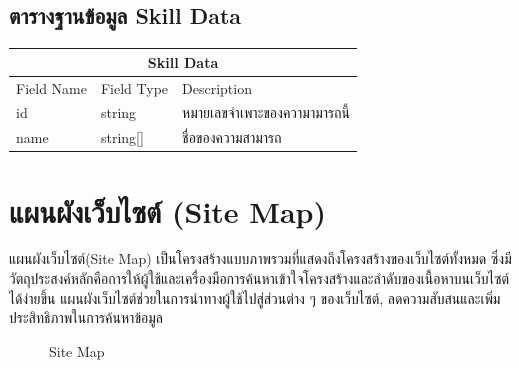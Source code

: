 \subsection{ตารางฐานข้อมูล Skill Data}
\begin{table}[H]
    \begin{tabular*}{\textwidth}{l|l|p{}}
        \hline
        \multicolumn{3}{c}{Skill Data}                              \\\hline
        Field Name    & Field Type & Description                  \\\hline
        id    & string     & หมายเลขจำเพาะของความามารถนี้       \\
        name  & string[]   & ชื่อของความสามารถ \\ \hline
    \end{tabular*}
\end{table}


\section{แผนผังเว็บไซต์ (Site Map)}
แผนผังเว็บไซต์(Site Map) เป็นโครงสร้างแบบภาพรวมที่แสดงถึงโครงสร้างของเว็บไซต์ทั้งหมด ซึ่งมีวัตถุประสงค์หลักคือการให้ผู้ใช้และเครื่องมือการค้นหาเข้าใจโครงสร้างและลำดับของเนื้อหาบนเว็บไซต์ได้ง่ายขึ้น แผนผังเว็บไซต์ช่วยในการนำทางผู้ใช้ไปสู่ส่วนต่าง ๆ ของเว็บไซต์, ลดความสับสนและเพิ่มประสิทธิภาพในการค้นหาข้อมูล

\begin{figure}[H]\centering
    \setlength{\fboxrule}{0.2mm} %
    \setlength{\fboxsep}{0.5cm}
    \caption{Site Map}\label{fig:siteMap}
\end{figure}

